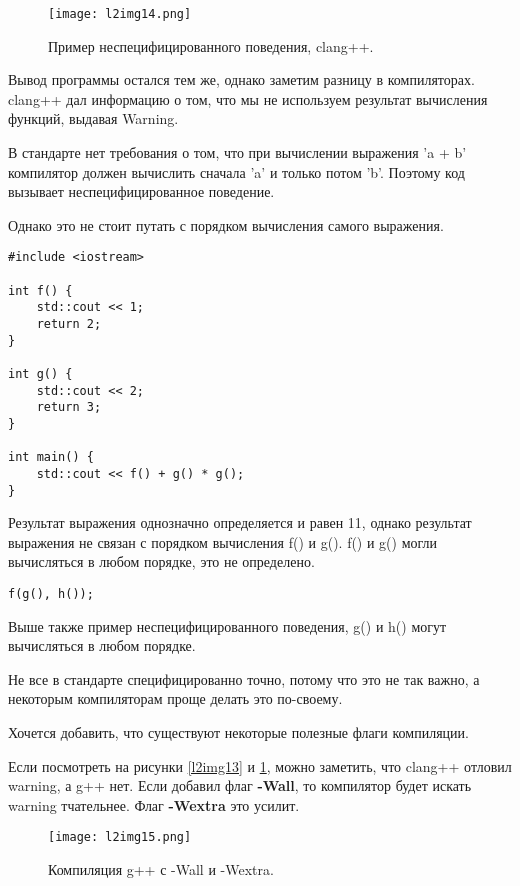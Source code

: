 \begin{figure}[h]
    \centering
    \texttt{[image: l2img14.png]}
    \caption{Пример неспецифицированного поведения, clang++.}
    \label{l2img14}
\end{figure}

Вывод программы остался тем же, однако заметим разницу в компиляторах.
clang++ дал информацию о том, что мы не используем результат вычисления функций, выдавая Warning.

В стандарте нет требования о том, что при вычислении выражения 'a + b' компилятор должен вычислить сначала 'a' и только потом 'b'.
Поэтому код вызывает неспецифицированное поведение.

Однако это не стоит путать с порядком вычисления самого выражения.


\begin{verbatim}
#include <iostream>

int f() {
    std::cout << 1;
    return 2;
}

int g() {
    std::cout << 2;
    return 3;
}

int main() {
    std::cout << f() + g() * g();
}
\end{verbatim}


Результат выражения однозначно определяется и равен 11,
однако результат выражения не связан с порядком вычисления f() и g().
f() и g() могли вычисляться в любом порядке, это не определено.

\begin{verbatim}
f(g(), h());
\end{verbatim}

Выше также пример неспецифицированного поведения, g() и h() могут вычисляться в любом порядке.

Не все в стандарте специфицированно точно, потому что это не так важно, а некоторым компиляторам проще делать это по-своему.

Хочется добавить, что существуют некоторые полезные флаги компиляции.

Если посмотреть на рисунки \ref{l2img13} и \ref{l2img14}, можно заметить, что clang++ отловил warning, а g++ нет.
Если добавил флаг \textbf{-Wall}, то компилятор будет искать warning тчательнее. Флаг \textbf{-Wextra} это усилит.

\begin{figure}[h]
    \centering
    \texttt{[image: l2img15.png]}
    \caption{Компиляция g++ с -Wall и -Wextra.}
    \label{l2img15}
\end{figure}

